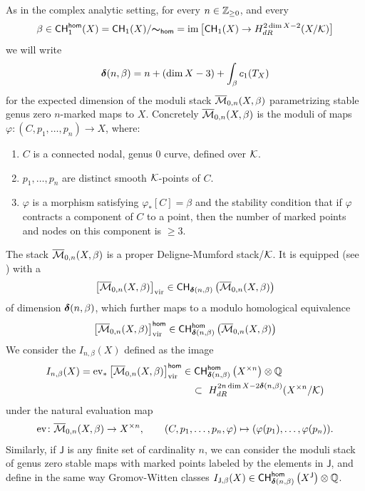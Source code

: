 \documentclass[twoside,leqno]{article}
\numberwithin{equation}{section}
\theoremstyle{plain}
\theoremstyle{definition}
\begin{document}
As in the complex analytic setting, for every $n \in \mathbb Z_{\geq 0}$, and every 
\[
\beta \in \mathsf{CH}^{\mathsf{hom}}_{1}(X) = \mathsf{CH}_{1}(X)/{\boldsymbol{\sim}_{\mathsf{hom}}} = 
\operatorname{im}\left[\mathsf{CH}_{1}(X) \to H^{2\dim X - 2}_{dR}(X/\mathcal K)\right]
\]
we will write
\[
\boldsymbol{\delta}(n,\beta) = n + (\dim X - 3) + \int_{\beta}c_{1}(T_{X}) 
\]
for the expected dimension of the moduli stack $\overline{\mathcal{M}}_{0,n}(X,\beta)$ parametrizing stable genus zero $n$-marked  maps to $X$. Concretely  $\overline{\mathcal{M}}_{0,n}(X,\beta)$ is the moduli of maps
$\varphi \colon  (C,p_{1},\ldots, p_{n}) \to X$, where:
\begin{enumerate}[wide]
\item $C$ is a connected  nodal, genus $0$ curve, defined over $\mathcal K$.
\item $p_{1},\ldots,p_{n}$ are distinct smooth $\mathcal K$-points of $C$.
\item $\varphi$ is a morphism satisfying $\varphi_{*}[C] = \beta$
and the stability condition that if $\varphi$ contracts a component of $C$ to a point, 
then the number of marked points and nodes on this component is $\geq 3$.
\end{enumerate}
The stack $\overline{\mathcal{M}}_{0,n}(X,\beta)$ is a proper Deligne-Mumford stack/$\mathcal K$. 
It is equipped (see \cite{Kontsevich_Gromov-Witten_classes,
Behrend_Gromov-Witten_invariants,Behrend_Intrinsic_normal_cone}) with a 
\[
\left[\overline{\mathcal{M}}_{0,n}(X,\beta)\right]_{\operatorname{vir}}  \in \mathsf{CH}_{\boldsymbol{\delta}(n,\beta)}\left(\overline{\mathcal{M}}_{0,n}(X,\beta)\right)
\]
of dimension $\boldsymbol{\delta}(n,\beta)$, which further maps to 
a  modulo homological equivalence 
\[
\left[\overline{\mathcal{M}}_{0,n}(X,\beta)\right]_{\operatorname{vir}}^{\mathsf{hom}}  \in \mathsf{CH}^{\mathsf{hom}}_{\boldsymbol{\delta}(n,\beta)}\left(\overline{\mathcal{M}}_{0,n}(X,\beta)\right)
\]
We consider the 
$I_{n,\beta}(X)$ defined as the image
\[
\begin{aligned}
I_{n,\beta}(X)  = \operatorname{ev}_{*}\left[\overline{\mathcal{M}}_{0,n}(X,\beta)\right]_{\operatorname{vir}}^{\mathsf{hom}} 
& \in \mathsf{CH}^{\mathsf{hom}}_{\boldsymbol{\delta}(n,\beta)}\left(X^{\times n} \right)\otimes \mathbb Q\\
& \quad \subset \ H^{2n\dim X - 2\boldsymbol{\delta}(n,\beta)}_{dR}(X^{\times n}/\mathcal K)
\end{aligned}
\]
under the natural evaluation map 
\[
\operatorname{ev} \colon \overline{\mathcal{M}}_{0,n}(X,\beta) \to X^{\times n}, \qquad
(C,p_{1},\ldots,p_{n},\varphi) \mapsto (\varphi(p_{1}), \ldots, \varphi(p_{n})).
\]
Similarly, if $\mathsf{J}$ is any finite set of cardinality $n$, we can consider the moduli stack of genus zero stable maps with marked points labeled by the elements in $\mathsf{J}$, and define in the same way Gromov-Witten classes 
$I_{\mathsf{J},\beta}(X) \in 
\mathsf{CH}^{\mathsf{hom}}_{\boldsymbol{\delta}(n,\beta)}\left(X^{\mathsf{J}}\right)\otimes \mathbb Q$.
\end{document}
